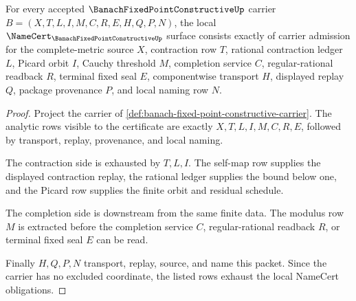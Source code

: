 \begin{theorem}
\label{thm:banach-fixed-point-constructive-namecert-obligations}
For every accepted $\BanachFixedPointConstructiveUp$ carrier $B=(X,T,L,I,M,C,R,E,H,Q,P,N)$, the local $\NameCert_{\BanachFixedPointConstructiveUp}$ surface consists exactly of carrier admission for the complete-metric source $X$, contraction row $T$, rational contraction ledger $L$, Picard orbit $I$, Cauchy threshold $M$, completion service $C$, regular-rational readback $R$, terminal fixed seal $E$, componentwise transport $H$, displayed replay $Q$, package provenance $P$, and local naming row $N$.
\end{theorem}
\begin{proof}
Project the carrier of \autoref{def:banach-fixed-point-constructive-carrier}. The analytic rows visible to the certificate are exactly $X,T,L,I,M,C,R,E$, followed by transport, replay, provenance, and local naming.

The contraction side is exhausted by $T,L,I$. The self-map row supplies the displayed contraction replay, the rational ledger supplies the bound below one, and the Picard row supplies the finite orbit and residual schedule.

The completion side is downstream from the same finite data. The modulus row $M$ is extracted before the completion service $C$, regular-rational readback $R$, or terminal fixed seal $E$ can be read.

Finally $H,Q,P,N$ transport, replay, source, and name this packet. Since the carrier has no excluded coordinate, the listed rows exhaust the local NameCert obligations.
\end{proof}

